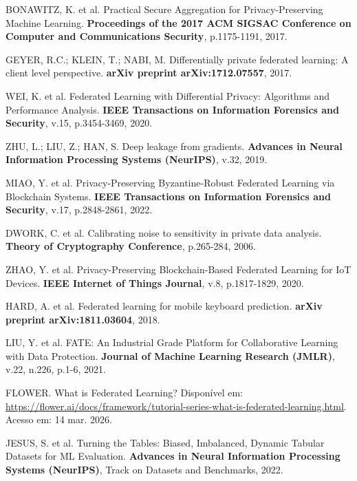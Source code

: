 
BONAWITZ, K. et al.
Practical Secure Aggregation for Privacy-Preserving Machine Learning.
{\bf Proceedings of the 2017 ACM SIGSAC Conference on Computer and Communications Security},
p.1175-1191, 2017.

GEYER, R.C.; KLEIN, T.; NABI, M.
Differentially private federated learning: A client level perspective.
{\bf arXiv preprint arXiv:1712.07557}, 2017.

WEI, K. et al.
Federated Learning with Differential Privacy: Algorithms and Performance Analysis.
{\bf IEEE Transactions on Information Forensics and Security},
v.15, p.3454-3469, 2020.

ZHU, L.; LIU, Z.; HAN, S.
Deep leakage from gradients.
{\bf Advances in Neural Information Processing Systems (NeurIPS)},
v.32, 2019.

MIAO, Y. et al.
Privacy-Preserving Byzantine-Robust Federated Learning via Blockchain Systems.
{\bf IEEE Transactions on Information Forensics and Security},
v.17, p.2848-2861, 2022.

DWORK, C. et al.
Calibrating noise to sensitivity in private data analysis.
{\bf Theory of Cryptography Conference},
p.265-284, 2006.


ZHAO, Y. et al.
Privacy-Preserving Blockchain-Based Federated Learning for IoT Devices.
{\bf IEEE Internet of Things Journal},
v.8, p.1817-1829, 2020.

HARD, A. et al.
Federated learning for mobile keyboard prediction.
{\bf arXiv preprint arXiv:1811.03604}, 2018.


LIU, Y. et al.
FATE: An Industrial Grade Platform for Collaborative Learning with Data Protection.
{\bf Journal of Machine Learning Research (JMLR)},
v.22, n.226, p.1-6, 2021.

FLOWER.
What is Federated Learning?
Disponível em: \url{https://flower.ai/docs/framework/tutorial-series-what-is-federated-learning.html}.
Acesso em: 14 mar. 2026.


JESUS, S. et al.
Turning the Tables: Biased, Imbalanced, Dynamic Tabular Datasets for ML Evaluation.
{\bf Advances in Neural Information Processing Systems (NeurIPS)},
Track on Datasets and Benchmarks, 2022.

